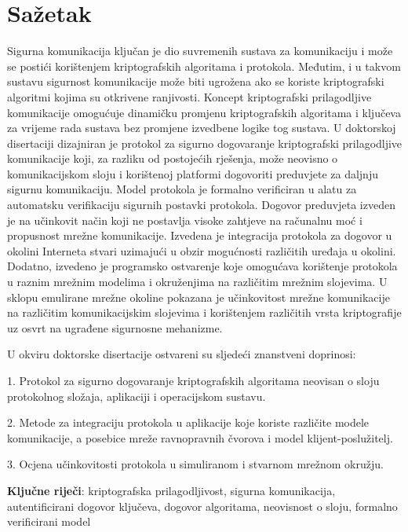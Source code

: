 \thispagestyle{empty}
\section*{Sažetak}

Sigurna komunikacija ključan je dio suvremenih sustava za komunikaciju i može se
postići korištenjem kriptografskih algoritama i protokola.
Međutim, i u takvom sustavu sigurnost komunikacije može biti ugrožena ako se
koriste
kriptografski algoritmi kojima su otkrivene ranjivosti. Koncept kriptografski
prilagodljive komunikacije omogućuje dinamičku promjenu kriptografskih
algoritama i ključeva za vrijeme rada sustava bez promjene izvedbene logike tog
sustava.
U doktorskoj disertaciji dizajniran je protokol za
sigurno dogovaranje kriptografski prilagodljive komunikacije koji, za razliku od
postojećih rješenja, može neovisno o komunikacijskom sloju i korištenoj
platformi dogovoriti preduvjete za daljnju sigurnu komunikaciju. Model protokola
je formalno verificiran u alatu za automatsku verifikaciju sigurnih postavki
protokola. Dogovor preduvjeta izveden je na učinkovit način koji ne postavlja
visoke zahtjeve na računalnu moć i propusnost mrežne komunikacije. Izvedena je
integracija protokola za dogovor u okolini Interneta stvari uzimajući u obzir
mogućnosti različitih uređaja u okolini. Dodatno, izvedeno je programsko
ostvarenje koje
omogućava korištenje protokola u raznim mrežnim modelima i okruženjima na
različitim mrežnim slojevima. U sklopu emulirane mrežne okoline pokazana je
učinkovitost mrežne komunikacije na različitim komunikacijskim slojevima i
korištenjem različitih vrsta kriptografije uz osvrt na ugrađene sigurnosne
mehanizme.

U okviru doktorske disertacije ostvareni su sljedeći znanstveni doprinosi:

1. Protokol za sigurno dogovaranje kriptografskih algoritama neovisan o sloju
protokolnog složaja, aplikaciji i operacijskom sustavu.

2. Metode za integraciju protokola u aplikacije koje koriste različite modele
komunikacije, a posebice mreže ravnopravnih čvorova i model klijent-poslužitelj.

3. Ocjena učinkovitosti protokola u simuliranom i stvarnom mrežnom okružju.

\vspace{1cm}
\textbf{Ključne riječi}: kriptografska prilagodljivost, sigurna komunikacija,
autentificirani dogovor ključeva, dogovor algoritama, neovisnost o sloju,
formalno verificirani model

